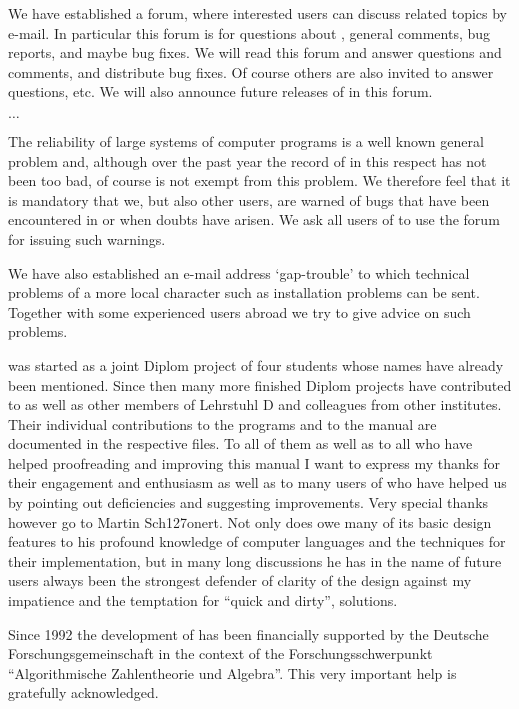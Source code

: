 We  have established a {\GAP} forum, where interested  users  can discuss
{\GAP}  related  topics  by  e-mail.  In particular  this  forum  is  for
questions about  {\GAP}, general  comments, bug  reports,  and  maybe bug
fixes.   We will read this forum and answer questions  and  comments, and
distribute  bug  fixes.  Of course  others  are  also  invited to  answer
questions, etc.  We will  also announce future releases of {\GAP} in this
forum.

$\ldots$

The reliability of  large systems  of  computer programs is  a well known
general problem and, although over the past year the  record of {\GAP} in
this respect has not been too  bad, of  course  {\GAP} is not exempt from
this problem.  We therefore feel that it is mandatory  that  we, but also
other users, are warned of bugs that  have been encountered in  {\GAP} or
when doubts have arisen.  We  ask all users of {\GAP} to  use  the {\GAP}
forum for issuing such warnings.

We   have  also established  an e-mail    address  `gap-trouble' to which
technical  problems   of a  more local   character  such as  installation
problems can be sent. Together  with some experienced {\GAP} users abroad
we try to give advice on such problems.

{\GAP} was started as a joint Diplom project of four students whose names
have  already  been  mentioned.   Since then many   more finished  Diplom
projects have contributed to {\GAP} as well as other members of Lehrstuhl
D  and colleagues from other  institutes.  Their individual contributions
to the programs and to the manual are documented in the respective files.
To all of   them as well    as to all who  have   helped proofreading and
improving this manual  I want to express  my thanks for their  engagement
and enthusiasm as well as to many users  of {\GAP} who  have helped us by
pointing out   deficiencies and  suggesting improvements.   Very  special
thanks however go to  Martin Sch\accent127onert.  Not only  does {\GAP}
owe many  of  its  basic design  features  to his  profound  knowledge of
computer languages  and the techniques for  their  implementation, but in
many long discussions he has in the name of  future users always been the
strongest defender of clarity of the design against my impatience and the
temptation for ``quick and dirty'', solutions.

Since  1992 the development of  {\GAP}  has been financially supported by
the Deutsche     Forschungsgemeinschaft    in  the   context      of  the
Forschungsschwerpunkt  ``Algorithmische Zahlentheorie   und  Algebra''.
This very important help is gratefully acknowledged.

